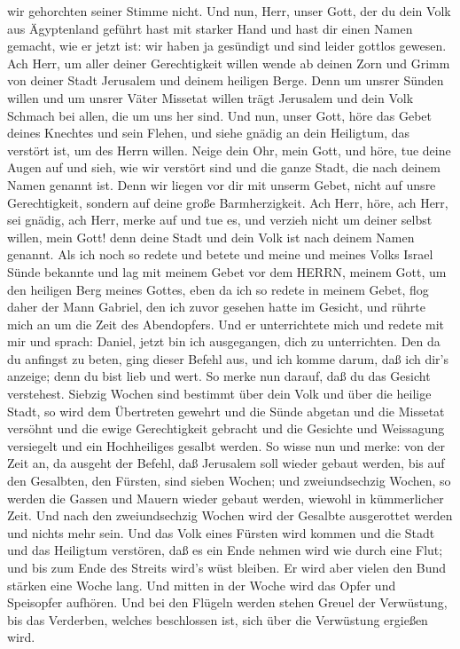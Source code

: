 wir gehorchten seiner Stimme nicht.  Und nun, Herr, unser
Gott, der du dein Volk aus Ägyptenland geführt hast mit starker Hand und
hast dir einen Namen gemacht, wie er jetzt ist: wir haben ja gesündigt
und sind leider gottlos gewesen.  Ach Herr, um aller deiner
Gerechtigkeit willen wende ab deinen Zorn und Grimm von deiner Stadt
Jerusalem und deinem heiligen Berge. Denn um unsrer Sünden willen und um
unsrer Väter Missetat willen trägt Jerusalem und dein Volk Schmach bei
allen, die um uns her sind.  Und nun, unser Gott, höre das
Gebet deines Knechtes und sein Flehen, und siehe gnädig an dein
Heiligtum, das verstört ist, um des Herrn willen.  Neige
dein Ohr, mein Gott, und höre, tue deine Augen auf und sieh, wie wir
verstört sind und die ganze Stadt, die nach deinem Namen genannt ist.
Denn wir liegen vor dir mit unserm Gebet, nicht auf unsre Gerechtigkeit,
sondern auf deine große Barmherzigkeit.  Ach Herr, höre,
ach Herr, sei gnädig, ach Herr, merke auf und tue es, und verzieh nicht
um deiner selbst willen, mein Gott! denn deine Stadt und dein Volk ist
nach deinem Namen genannt.  Als ich noch so redete und
betete und meine und meines Volks Israel Sünde bekannte und lag mit
meinem Gebet vor dem HERRN, meinem Gott, um den heiligen Berg meines
Gottes,  eben da ich so redete in meinem Gebet, flog daher
der Mann Gabriel, den ich zuvor gesehen hatte im Gesicht, und rührte
mich an um die Zeit des Abendopfers.  Und er unterrichtete
mich und redete mit mir und sprach: Daniel, jetzt bin ich ausgegangen,
dich zu unterrichten.  Den da du anfingst zu beten, ging
dieser Befehl aus, und ich komme darum, daß ich dir's anzeige; denn du
bist lieb und wert. So merke nun darauf, daß du das Gesicht verstehest.
 Siebzig Wochen sind bestimmt über dein Volk und über die
heilige Stadt, so wird dem Übertreten gewehrt und die Sünde abgetan und
die Missetat versöhnt und die ewige Gerechtigkeit gebracht und die
Gesichte und Weissagung versiegelt und ein Hochheiliges gesalbt werden.
 So wisse nun und merke: von der Zeit an, da ausgeht der
Befehl, daß Jerusalem soll wieder gebaut werden, bis auf den Gesalbten,
den Fürsten, sind sieben Wochen; und zweiundsechzig Wochen, so werden
die Gassen und Mauern wieder gebaut werden, wiewohl in kümmerlicher
Zeit.  Und nach den zweiundsechzig Wochen wird der Gesalbte
ausgerottet werden und nichts mehr sein. Und das Volk eines Fürsten wird
kommen und die Stadt und das Heiligtum verstören, daß es ein Ende nehmen
wird wie durch eine Flut; und bis zum Ende des Streits wird's wüst
bleiben.  Er wird aber vielen den Bund stärken eine Woche
lang. Und mitten in der Woche wird das Opfer und Speisopfer aufhören.
Und bei den Flügeln werden stehen Greuel der Verwüstung, bis das
Verderben, welches beschlossen ist, sich über die Verwüstung ergießen
wird.

